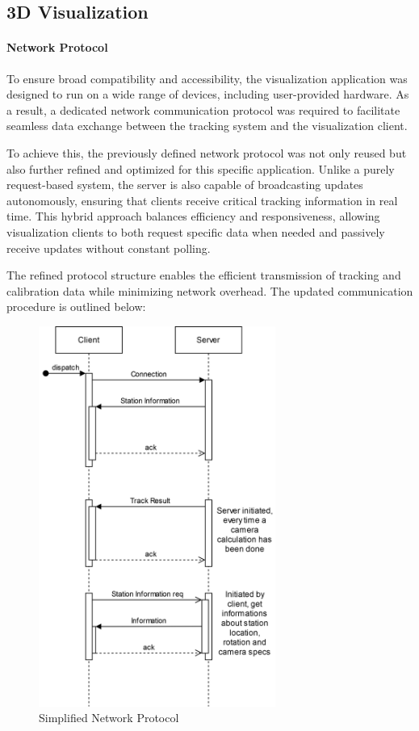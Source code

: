 
\subsection{3D Visualization}
\paragraph{Network Protocol}  
To ensure broad compatibility and accessibility, the visualization application was designed to run on a wide range of devices, including user-provided hardware. As a result, a dedicated network communication protocol was required to facilitate seamless data exchange between the tracking system and the visualization client.  

To achieve this, the previously defined network protocol was not only reused but also further refined and optimized for this specific application. Unlike a purely request-based system, the server is also capable of broadcasting updates autonomously, ensuring that clients receive critical tracking information in real time. This hybrid approach balances efficiency and responsiveness, allowing visualization clients to both request specific data when needed and passively receive updates without constant polling.  

The refined protocol structure enables the efficient transmission of tracking and calibration data while minimizing network overhead. The updated communication procedure is outlined below:  

\begin{figure}[H]
	\centering
	\hspace*{-1.5cm}
	\includegraphics[width=220pt]{figures/SS_Protocol}
	\caption{Simplified Network Protocol}
	\label{fig:ssprotocol}
\end{figure}

